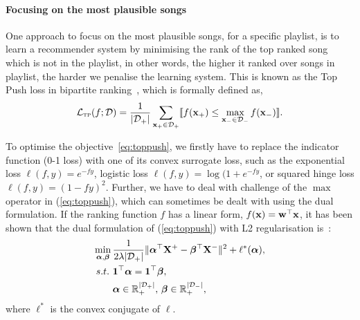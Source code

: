 

\paragraph{Focusing on the most plausible songs}
One approach to focus on the most plausible songs, for a specific playlist,
is to learn a recommender system by minimising the rank of the top ranked song which is not in the playlist,
in other words, the higher it ranked over songs in playlist, the harder we penalise the learning system.
This is known as the Top Push loss in bipartite ranking~\cite{li2014top}, which is formally defined as,
\begin{equation}
\label{eq:toppush}
\mathcal{L}_\textsc{tp}(f; \mathcal{D}) 
= \frac{1}{|\mathcal{D}_+|} \sum_{\mathbf{x}_+ \in \mathcal{D}_+} \llbracket f(\mathbf{x}_+) \le \max_{\mathbf{x}_- \in \mathcal{D}_-} f(\mathbf{x}_-) \rrbracket.
\end{equation}

To optimise the objective~\ref{eq:toppush}, 
we firstly have to replace the indicator function (0-1 loss) with one of its convex surrogate loss,
such as the exponential loss $\ell(f, y) = e^{-fy}$, logistic loss $\ell(f, y) = \log(1 + e^{-fy}$, or squared hinge loss $\ell(f, y) = (1 - fy)^2$.
Further, we have to deal with challenge of the $\max$ operator in (\ref{eq:toppush}), which can sometimes be dealt with using the dual formulation.
If the ranking function $f$ has a linear form, \ie $f(\mathbf{x}) = \mathbf{w}^\top \mathbf{x}$, it has been shown that the dual formulation of (\ref{eq:toppush}) 
with L2 regularisation is~\cite{li2014top}:
\begin{equation*}
\begin{aligned}
\min_{{\bm{\alpha}}, {\bm{\beta}}} \, & \frac{1}{2 \lambda |\mathcal{D}_+|} \| {\bm{\alpha}}^\top \mathbf{X}^+ - {\bm{\beta}}^\top \mathbf{X}^- \|^2 + \ell^*({\bm{\alpha}}), \\
s.t. \ & \mathbf{1}^\top {\bm{\alpha}} = \mathbf{1}^\top {\bm{\beta}}, \\
       & {\bm{\alpha}} \in \mathbb{R}_+^{|\mathcal{D}_+|}, \, {\bm{\beta}} \in \mathbb{R}_+^{|\mathcal{D}_-|},
\end{aligned}
\end{equation*}
where $\ell^*$ is the convex conjugate of $\ell$.


